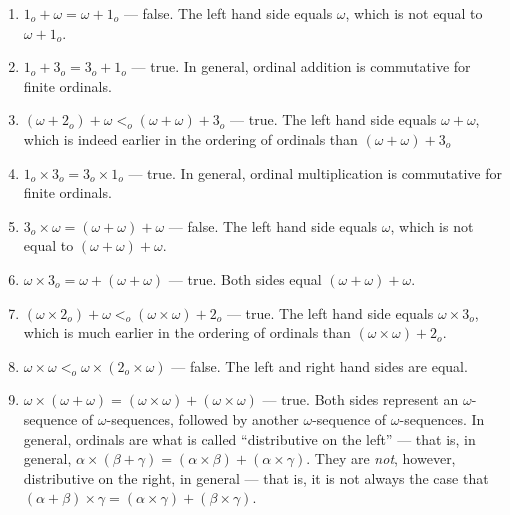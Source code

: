 \documentclass[12pt,a4paper]{article}
\begin{document}
\begin{enumerate}
\begin{enumerate}
	\item $1_o + \omega = \omega + 1_o$ --- false. The left hand side equals $\omega$, which is not equal to $\omega+1_o$.
	
	\item $1_o +3_o = 3_o +1_o$ --- true. In general, ordinal addition is commutative for finite ordinals.
	\item $(\omega+2_o)+\omega <_o (\omega+\omega)+3_o$ --- true. The left hand side equals $\omega+\omega$, which is indeed earlier in the ordering of ordinals than $(\omega+\omega)+3_o$
	\item $1_o\times3_o = 3_o\times1_o$ --- true. In general, ordinal multiplication is commutative for finite ordinals.
	\item $3_o\times\omega = (\omega + \omega) + \omega$ --- false. The left hand side equals $\omega$, which is not equal to $(\omega + \omega) + \omega$.
	\item $\omega\times3_o =\omega+(\omega+\omega)$ --- true. Both sides equal $(\omega+\omega)+\omega$.
	\item $(\omega\times2_o)+\omega <_o (\omega\times\omega)+2_o$ --- true. The left hand side equals $\omega\times3_o$, which is much earlier in the ordering of ordinals than $(\omega\times\omega)+2_o$.
	\item $\omega\times\omega <_o \omega\times (2_o \times\omega)$ --- false. The left and right hand sides are equal.
	\item $\omega\times(\omega+\omega)=(\omega\times\omega)+(\omega\times\omega)$ --- true. Both sides represent an $\omega$-sequence of $\omega$-sequences, followed by another $\omega$-sequence of $\omega$-sequences. In general, ordinals are what is called ``distributive on the left'' --- that is, in general, $\alpha\times(\beta+\gamma)=(\alpha\times\beta )+ (\alpha\times\gamma)$. They are \emph{not}, however, distributive on the right, in general --- that is, it is not always the case that  $(\alpha+\beta)\times\gamma = (\alpha\times\gamma) + (\beta\times\gamma)$.
	\end{enumerate}


\end{enumerate}
\end{document}
